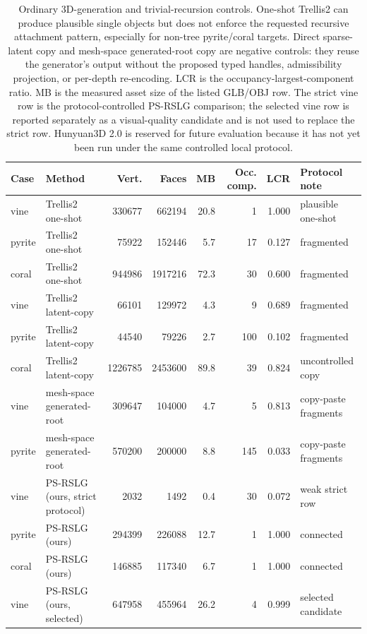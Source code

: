 \begin{table}[t]
\centering
\small
\setlength{\tabcolsep}{3.2pt}
\begin{tabular}{llrrrrrl}
\toprule
Case & Method & Vert. & Faces & MB & Occ. comp. & LCR & Protocol note \\
\midrule
vine & Trellis2 one-shot & 330677 & 662194 & 20.8 & 1 & 1.000 & plausible one-shot \\
pyrite & Trellis2 one-shot & 75922 & 152446 & 5.7 & 17 & 0.127 & fragmented \\
coral & Trellis2 one-shot & 944986 & 1917216 & 72.3 & 30 & 0.600 & fragmented \\
\midrule
vine & Trellis2 latent-copy & 66101 & 129972 & 4.3 & 9 & 0.689 & fragmented \\
pyrite & Trellis2 latent-copy & 44540 & 79226 & 2.7 & 100 & 0.102 & fragmented \\
coral & Trellis2 latent-copy & 1226785 & 2453600 & 89.8 & 39 & 0.824 & uncontrolled copy \\
\midrule
vine & mesh-space generated-root & 309647 & 104000 & 4.7 & 5 & 0.813 & copy-paste fragments \\
pyrite & mesh-space generated-root & 570200 & 200000 & 8.8 & 145 & 0.033 & copy-paste fragments \\
\midrule
vine & PS-RSLG (ours, strict protocol) & 2032 & 1492 & 0.4 & 30 & 0.072 & weak strict row \\
pyrite & PS-RSLG (ours) & 294399 & 226088 & 12.7 & 1 & 1.000 & connected \\
coral & PS-RSLG (ours) & 146885 & 117340 & 6.7 & 1 & 1.000 & connected \\
vine & PS-RSLG (ours, selected) & 647958 & 455964 & 26.2 & 4 & 0.999 & selected candidate \\
\bottomrule
\end{tabular}
\caption{Ordinary 3D-generation and trivial-recursion controls. One-shot Trellis2 can produce plausible single objects but does not enforce the requested recursive attachment pattern, especially for non-tree pyrite/coral targets. Direct sparse-latent copy and mesh-space generated-root copy are negative controls: they reuse the generator's output without the proposed typed handles, admissibility projection, or per-depth re-encoding. LCR is the occupancy-largest-component ratio. MB is the measured asset size of the listed GLB/OBJ row. The strict vine row is the protocol-controlled PS-RSLG comparison; the selected vine row is reported separately as a visual-quality candidate and is not used to replace the strict row. Hunyuan3D 2.0 is reserved for future evaluation because it has not yet been run under the same controlled local protocol.}
\label{tab:gen3d-baseline-summary-20260510}
\end{table}
